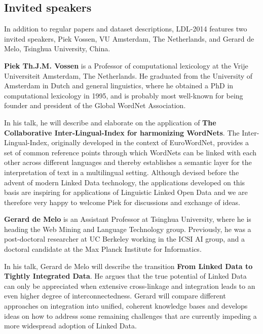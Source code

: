 \subsection{Invited speakers}

In addition to regular papers and dataset descriptions, LDL-2014 features two invited speakers, Piek Vossen, VU Amsterdam, The Netherlands, and Gerard de Melo, Tsinghua University, China.

\smallskip

\textbf{Piek Th.J.M. Vossen} is a Professor of computational lexicology at the Vrije Universiteit Amsterdam, The Netherlands. He graduated from the University of Amsterdam in Dutch and general linguistics, where he obtained a PhD in computational lexicology in 1995, and is probably most well-known for being founder and president of the Global WordNet Association.

In his talk, he will describe and elaborate on the application of \textbf{The Collaborative Inter-Lingual-Index for harmonizing WordNets}. 
The Inter-Lingual-Index, originally developed in the context of EuroWordNet, provides a set of common reference points through which WordNets can be linked with each other across different languages and thereby establishes a semantic layer for the interpretation of text in a multilingual setting. Although devised before the advent of modern Linked Data technology, the applications developed on this basis are inspiring for applications of Linguistic Linked Open Data and we are therefore very happy to welcome Piek for discussions and exchange of ideas.


\smallskip

\textbf{Gerard de Melo} is an Assistant Professor at Tsinghua
 University, where he is heading the Web Mining and Language Technology
 group. Previously, he was a post-doctoral researcher at UC Berkeley
 working in the ICSI AI group, and a doctoral candidate at the Max Planck
 Institute for Informatics.

In his talk, Gerard de Melo will describe the transition \textbf{From Linked Data to Tightly Integrated Data}. 
He argues that the true potential of Linked Data can only be appreciated when extensive cross-linkage and integration leads to an even higher degree of interconnectedness. Gerard will compare different approaches on integration into unified, coherent knowledge bases and develops ideas on how to address some remaining challenges that are currently
 impeding a more widespread adoption of Linked Data. 
